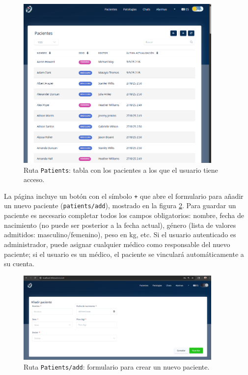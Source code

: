 \documentclass[12pt, a4paper]{article}
\begin{document}
\begin{umaappendices}
	\begin{figure}[htbp]
		\centering
		\includegraphics[width=0.9\textwidth]{images/4_pacientes.png}
		\caption[Ejemplo]{Ruta \texttt{Patients}: tabla con los pacientes a los que el usuario tiene acceso.}
		\label{fig:list}
	\end{figure}
	
	La página incluye un botón con el símbolo \texttt{+} que abre el formulario para añadir un nuevo paciente (\texttt{patients/add}), mostrado en la figura \ref{fig:add}. Para guardar un paciente es necesario completar todos los campos obligatorios: nombre, fecha de nacimiento (no puede ser posterior a la fecha actual), género (lista de valores admitidos: masculino/femenino), peso en kg, etc. Si el usuario autenticado es administrador, puede asignar cualquier médico como responsable del nuevo paciente; si el usuario es un médico, el paciente se vinculará automáticamente a su cuenta.
	

	
	\begin{figure}[htbp]
		\centering
		\includegraphics[width=0.9\textwidth]{images/5_patientadd.png}
		\caption[Ejemplo]{Ruta \texttt{Patients/add}: formulario para crear un nuevo paciente.}
		\label{fig:add}
	\end{figure}
	\vspace{-10pt}
	

\end{umaappendices}
\end{document}
